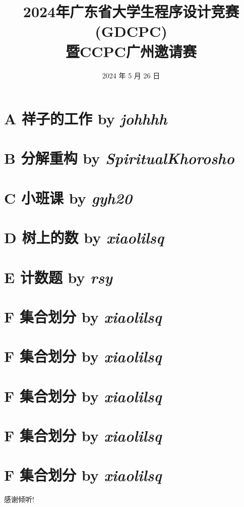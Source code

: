 \documentclass[dvipsnames]{ctexbeamer}
\title{2024年广东省大学生程序设计竞赛(GDCPC) \\ 暨CCPC广州邀请赛}
\author{}
\institute{清华大学学生算法协会}
\date{2024 年 5 月 26 日}
\begin{document}
\frame{\titlepage}


\frame[allowframebreaks]{
    \tableofcontents[sections={1-5}]
    \framebreak
    \tableofcontents[sections={6-10}]
}


\section{A 祥子的工作 by \itshape johhhh}


\section{B 分解重构 by \itshape SpiritualKhorosho}


\section{C 小班课 by \itshape gyh20}


\section{D 树上的数 by \itshape xiaolilsq}


\section{E 计数题 by \itshape rsy}


\section{F 集合划分 by \itshape xiaolilsq}



\section{F 集合划分 by \itshape xiaolilsq}



\section{F 集合划分 by \itshape xiaolilsq}


\section{F 集合划分 by \itshape xiaolilsq}



\section{F 集合划分 by \itshape xiaolilsq}


\begin{frame}{}
    \begin{center}
        \Large 感谢倾听!
    \end{center}
\end{frame}
\end{document}
